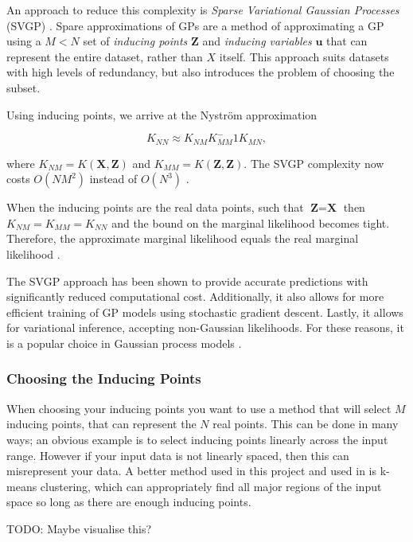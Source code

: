 \documentclass[12pt,a4paper]{report}
\theoremstyle{definition}
\begin{document}
An approach to reduce this complexity is \emph{Sparse Variational Gaussian Processes} (SVGP) \citep{Hensman2014}.
Spare approximations of GPs are a method of approximating a GP using a $M < N$ set of \emph{inducing points} $\textbf{Z}$ and \emph{inducing variables} $\textbf{u}$ that can represent the entire dataset, rather than $X$ itself. 
This approach suits datasets with high levels of redundancy, but also introduces the problem of choosing the subset.

Using inducing points, we arrive at the Nystr{\"o}m approximation

\begin{equation}
	K_{NN} \approx K_{NM} K_{MM}^-1 K_{MN},
\end{equation}

where $K_{NM} = K(\textbf{X}, \textbf{Z})$ and $K_{MM} = K(\textbf{Z}, \textbf{Z})$.
The SVGP complexity now costs $O(NM^2)$ instead of $O(N^3)$ \citep{Lui2020}.

When the inducing points are the real data points, such that $\textbf{Z} = \textbf{X}$ then $K_{NM} = K_{MM} = K_{NN}$ and the bound on the marginal likelihood becomes tight. 
Therefore, the approximate marginal likelihood equals the real marginal likelihood \citep{Hensman2014}.

The SVGP approach has been shown to provide accurate predictions with significantly reduced computational cost. 
Additionally, it also allows for more efficient training of GP models using stochastic gradient descent.
Lastly, it allows for variational inference, accepting non-Gaussian likelihoods.
For these reasons, it is a popular choice in Gaussian process models \citep{SVGPYi2020}.

\subsubsection{Choosing the Inducing Points}

When choosing your inducing points you want to use a method that will select $M$ inducing points, that can represent the $N$ real points.
This can be done in many ways; an obvious example is to select inducing points linearly across the input range. 
However if your input data is not linearly spaced, then this can misrepresent your data.
A better method used in this project and used in \citet{Hensman2014} is k-means clustering, which can appropriately find all major regions of the input space so long as there are enough inducing points.

TODO: Maybe visualise this?
\end{document}
